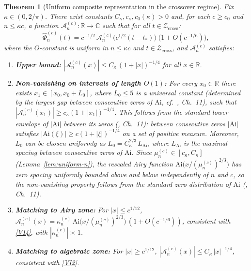 \documentclass[12pt,a4paper]{amsart}
\newtheorem{theorem}{Theorem}[section]
\theoremstyle{definition}
\theoremstyle{remark}
\newcommand{\Ai}{\mathrm{Ai}}
\newcommand{\Zcross}{\mathcal{Z}_{\mathrm{cross}}}
\newcommand{\tstar}{t_*}
\begin{document}
\begin{theorem}[Uniform composite representation in the crossover regime]
\label{thm:A}
Fix $\kappa \in (0,2/\pi)$.
There exist constants $C_\kappa, c_\kappa, c_0(\kappa) > 0$
and, for each $c \ge c_0$ and $n \le \kappa c$,
a function $\mathcal{A}_n^{(c)} : \mathbb{R} \to \mathbb{C}$
such that for all $t \in \Zcross$:
\begin{equation}
\label{eq:composite-A}
\widehat{\Phi}_n^{(c)}(t)
= c^{-1/2}\,\mathcal{A}_n^{(c)}\!\bigl(c^{1/2}(t-\tstar)\bigr)
\;\bigl(1 + O(c^{-1/6})\bigr),
\end{equation}
where the $O$-constant is uniform in $n \le \kappa c$
and $t \in \Zcross$, and $\mathcal{A}_n^{(c)}$ satisfies:
\begin{enumerate}[\rm(a)]
\item\label{thm:A-upper}
\textbf{Upper bound:}
$|\mathcal{A}_n^{(c)}(x)|
\le C_\kappa\,(1+|x|)^{-1/4}$
for all $x \in \mathbb{R}$.
\item\label{thm:A-lower}
\textbf{Non-vanishing on intervals of length $O(1)$:}
For every $x_0 \in \mathbb{R}$ there exists
$x_1 \in [x_0, x_0 + L_0]$,
where $L_0 \le 5$ is a universal constant
(determined by the largest gap between consecutive
zeros of $\Ai$, cf.~\cite{Olver1974}, Ch.~11),
such that $|\mathcal{A}_n^{(c)}(x_1)| \ge c_\kappa(1+|x_1|)^{-1/4}$.
This follows from the standard lower envelope of $|\Ai|$ between its zeros
(\cite{Olver1974}, Ch.~11): between consecutive zeros $|\Ai|$ satisfies
$|\Ai(\xi)| \ge c(1+|\xi|)^{-1/4}$ on a set of positive measure.
Moreover, $L_0$ can be chosen uniformly as
$L_0 = C_\kappa^{2/3}\,L_{\Ai}$,
where $L_{\Ai}$ is the maximal spacing between consecutive zeros of $\Ai$.
Since $\mu_n^{(c)} \in [c_\kappa, C_\kappa]$
(Lemma~\ref{lem:uniform-n}),
the rescaled Airy function
$\Ai\!\bigl(x/(\mu_n^{(c)})^{2/3}\bigr)$
has zero spacing uniformly bounded above and below
independently of $n$ and $c$,
so the non-vanishing property follows from
the standard zero distribution of $\Ai$
\textup{(\cite{Olver1974}, Ch.~11)}.
\item\label{thm:A-match-airy}
\textbf{Matching to Airy zone:}
For $|x| \le c^{1/12}$,
$\mathcal{A}_n^{(c)}(x)
= \kappa_n^{(c)}\,\Ai\!\bigl(x/(\mu_n^{(c)})^{2/3}\bigr)
\,(1 + O(c^{-1/6}))$,
consistent with \eqref{VI4},
with $|\kappa_n^{(c)}| \asymp 1$.
\item\label{thm:A-match-WKB}
\textbf{Matching to algebraic zone:}
For $|x| \ge c^{1/12}$,
$|\mathcal{A}_n^{(c)}(x)| \le C_\kappa\,|x|^{-1/4}$,
consistent with \eqref{VI2}.
\end{enumerate}
\end{theorem}
\end{document}
